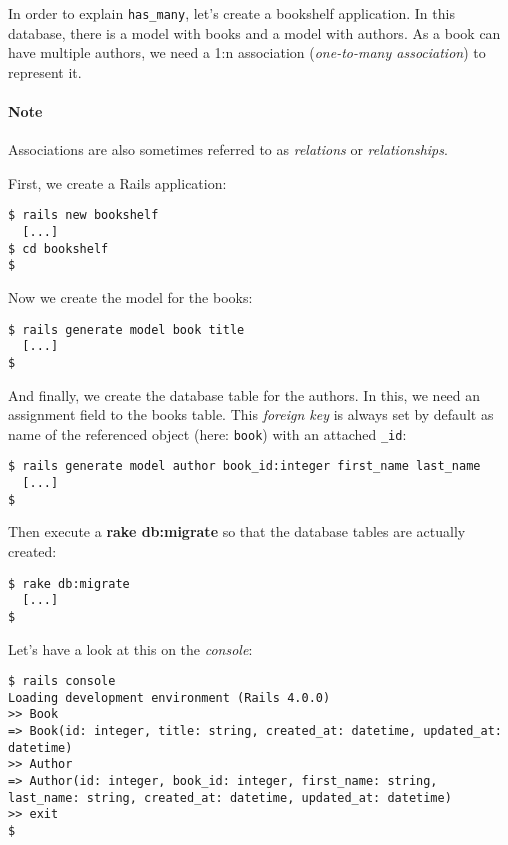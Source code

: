 \documentclass[a4paper]{book}
\newcounter{tab}[chapter]
\begin{document}
In order to explain \texttt{has\_many}, let's create a bookshelf application. In this database, there is a model with books and a model with authors. As a book can have multiple authors, we need a 1:n association (\emph{one-to-many association}) to represent it.

\paragraph{Note}\label{note-25}

Associations are also sometimes referred to as \emph{relations} or \emph{relationships}.

First, we create a Rails application:

\begin{shaded}\begin{verbatim}
$ rails new bookshelf
  [...]
$ cd bookshelf
$
\end{verbatim}\end{shaded}

Now we create the model for the books:

\begin{shaded}\begin{verbatim}
$ rails generate model book title
  [...]
$
\end{verbatim}\end{shaded}

And finally, we create the database table for the authors. In this, we need an assignment field to the books table. This \emph{foreign key} is always set by default as name of the referenced object (here: \texttt{book}) with an attached \texttt{\_id}:

\begin{shaded}\begin{verbatim}
$ rails generate model author book_id:integer first_name last_name
  [...]
$
\end{verbatim}\end{shaded}

Then execute a \textbf{rake db:migrate} so that the database tables are actually created:

\begin{shaded}\begin{verbatim}
$ rake db:migrate
  [...]
$
\end{verbatim}\end{shaded}

Let's have a look at this on the \emph{console}:

\begin{shaded}\begin{verbatim}
$ rails console
Loading development environment (Rails 4.0.0)
>> Book
=> Book(id: integer, title: string, created_at: datetime, updated_at: datetime)
>> Author
=> Author(id: integer, book_id: integer, first_name: string, last_name: string, created_at: datetime, updated_at: datetime)
>> exit
$
\end{verbatim}\end{shaded}
\end{document}

